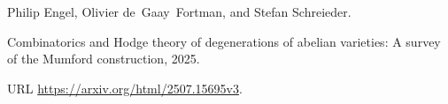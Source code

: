 Philip Engel, Olivier de~Gaay~Fortman, and Stefan Schreieder.

\newblock Combinatorics and {H}odge theory of degenerations of abelian
  varieties: A survey of the {M}umford construction, 2025.

\newblock URL \url{https://arxiv.org/html/2507.15695v3}.
